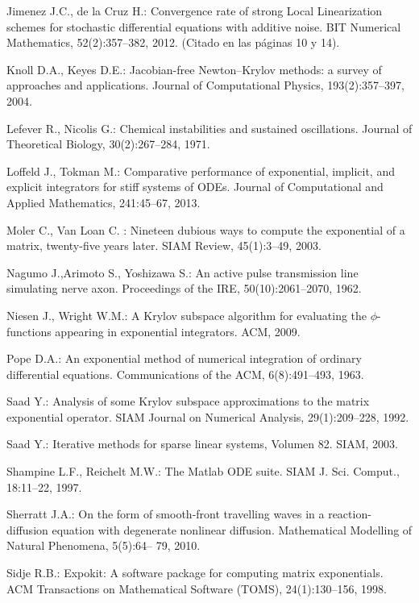 \begin{thebibliography}{99}
 Jimenez J.C., de la Cruz H.: Convergence rate of strong Local Linearization
schemes for stochastic differential equations with additive noise. BIT Numerical Mathematics,
52(2):357–382, 2012. (Citado en las páginas 10 y 14).

 Knoll D.A., Keyes D.E.: Jacobian-free Newton–Krylov methods: a survey of approaches
and applications. Journal of Computational Physics, 193(2):357–397, 2004.

 Lefever R., Nicolis G.: Chemical instabilities and sustained oscillations. Journal of
Theoretical Biology, 30(2):267–284, 1971.

 Loffeld J., Tokman M.: Comparative performance of exponential, implicit, and explicit
integrators for stiff systems of ODEs. Journal of Computational and Applied Mathematics,
241:45–67, 2013.

 Moler C., Van Loan C. : Nineteen dubious ways to compute the exponential of a matrix,
twenty-five years later. SIAM Review, 45(1):3–49, 2003.

 Nagumo J.,Arimoto S., Yoshizawa S.: An active pulse transmission line simulating
nerve axon. Proceedings of the IRE, 50(10):2061–2070, 1962.

 Niesen J., Wright W.M.: A Krylov subspace algorithm for evaluating the $\phi$-functions
appearing in exponential integrators. ACM, 2009.

 Pope D.A.: An exponential method of numerical integration of ordinary differential equations.
Communications of the ACM, 6(8):491–493, 1963.

 Saad Y.: Analysis of some Krylov subspace approximations to the matrix exponential operator.
SIAM Journal on Numerical Analysis, 29(1):209–228, 1992.

 Saad Y.: Iterative methods for sparse linear systems, Volumen 82. SIAM, 2003.

 Shampine L.F., Reichelt M.W.: The Matlab ODE suite. SIAM J. Sci. Comput., 18:11–22,
1997.

 Sherratt J.A.: On the form of smooth-front travelling waves in a reaction-diffusion equation
with degenerate nonlinear diffusion. Mathematical Modelling of Natural Phenomena, 5(5):64–
79, 2010.

 Sidje R.B.: Expokit: A software package for computing matrix exponentials. ACM Transactions
on Mathematical Software (TOMS), 24(1):130–156, 1998.


\end{thebibliography}
